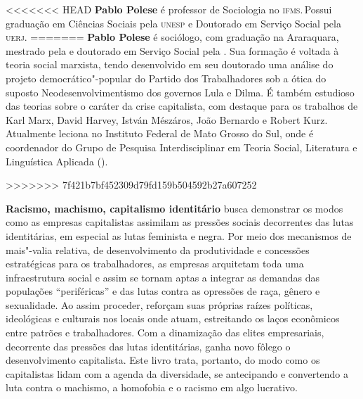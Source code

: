 <<<<<<< HEAD
\textbf{Pablo Polese} é professor de Sociologia no \textsc{ifms}.\,Possui graduação em
Ciências Sociais pela \textsc{unesp} e Doutorado em Serviço Social pela \textsc{uerj}.
=======
\textbf{Pablo Polese} é sociólogo, com graduação na  Araraquara, mestrado pela  e doutorado em Serviço Social pela . Sua formação é voltada à teoria social marxista, tendo desenvolvido em seu doutorado uma análise do projeto democrático"-popular do Partido dos Trabalhadores sob a ótica do suposto Neodesenvolvimentismo dos governos Lula e Dilma. É também estudioso das teorias sobre o caráter da crise capitalista, com destaque para os trabalhos de Karl Marx, David Harvey, István Mészáros, João Bernardo e Robert Kurz. Atualmente leciona no Instituto Federal de Mato Grosso do Sul, onde é coordenador do Grupo de Pesquisa Interdisciplinar em Teoria Social, Literatura e Linguística Aplicada (). 


>>>>>>> 7f421b7bf452309d79fd159b504592b27a607252

\textbf{Racismo, machismo, capitalismo identitário} busca demonstrar os modos como as empresas capitalistas assimilam as
pressões sociais decorrentes das lutas identitárias, em especial as
lutas feminista e negra. Por meio dos mecanismos de mais"-valia relativa,
de desenvolvimento da produtividade e concessões estratégicas para os
trabalhadores, as empresas arquitetam toda uma infraestrutura social e
assim se tornam aptas a integrar as demandas das populações
``periféricas'' e das lutas contra as opressões de raça, gênero e
sexualidade. Ao assim proceder, reforçam suas próprias raízes políticas,
ideológicas e culturais nos locais onde atuam, estreitando os laços
econômicos entre patrões e trabalhadores. Com a dinamização das elites
empresariais, decorrente das pressões das lutas identitárias, ganha novo
fôlego o desenvolvimento capitalista. Este livro trata, portanto, do
modo como os capitalistas lidam com a agenda da diversidade, se
antecipando e convertendo a luta contra o machismo, a homofobia e o
racismo em algo lucrativo.

